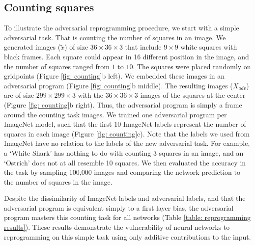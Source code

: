 \documentclass{article}
\begin{document}
\subsection{Counting squares}

To illustrate the adversarial reprogramming procedure, we start with a simple adversarial task. That is counting the number of squares in an image. 
We generated images ($\tilde x$) of size $36 \times 36 \times 3$ that include $9 \times 9$ white squares with black frames. Each square could appear in 16 different position in the image, and the number of squares ranged from $1$ to $10$. The squares were placed randomly on gridpoints (Figure \ref{fig: counting}b left). 
We embedded these images in an adversarial program (Figure \ref{fig: counting}b middle). 
The resulting images ($X_{adv}$) are of size $299 \times 299 \times 3$ with the $36 \times 36 \times 3$ images of the squares at the center (Figure \ref{fig: counting}b right). Thus, the adversarial program is simply a frame around the counting task images. 
We trained one adversarial program per ImageNet model, such that the first 10 ImageNet labels represent the number of squares in each image (Figure \ref{fig: counting}c). 
Note that the labels we used from ImageNet have no relation to the labels of the new adversarial task. For example, a `White Shark' has nothing to do with counting 3 squares in an image, and an `Ostrich' does not at all resemble 10 squares. 
We then evaluated the accuracy in the task by sampling 100,000 images and comparing the network prediction to the number of squares in the image. 

Despite the dissimilarity of ImageNet labels and adversarial labels, and that the adversarial program is equivalent simply to a first layer bias, the adversarial program masters this counting task for all networks (Table \ref{table: reprogramming results}). 
These results demonstrate the vulnerability of neural networks to reprogramming on this simple task using only additive contributions to the input.
\end{document}

